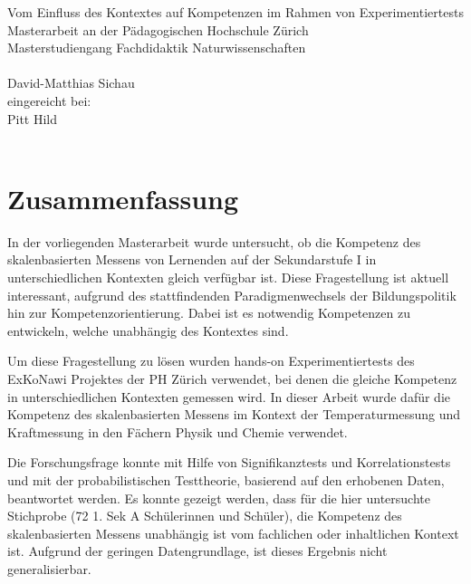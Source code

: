 \documentclass[12pt,oneside, DIV11]{scrbook}
\begin{document}
\frontmatter

\begin{titlepage}
	\vspace*{2cm}
	\begin{center}
		{\LARGE Vom Einfluss des Kontextes auf Kompetenzen im Rahmen von Experimentiertests
		 \vspace*{2cm}\\ Masterarbeit an der Pädagogischen Hochschule Zürich\vspace*{1cm}\\Masterstudiengang Fachdidaktik Naturwissenschaften\\}
		\vspace*{2cm}{\normalsize vorgelegt von:}\\ \large David-Matthias Sichau \\
		\vspace*{1.5cm} {\normalsize  eingereicht bei:}\\ \large Pitt Hild \\
		\vspace*{2cm}{\large 05. Februar 2015, Zürich}\\
	\end{center}
\end{titlepage}



\frontmatter 
\tableofcontents



\chapter*{Zusammenfassung}

In der vorliegenden Masterarbeit wurde untersucht, ob die Kompetenz des skalenbasierten Messens von Lernenden auf der Sekundarstufe I in unterschiedlichen Kontexten gleich verfügbar ist. Diese Fragestellung ist aktuell interessant, aufgrund des stattfindenden Paradigmenwechsels der Bildungspolitik hin zur Kompetenzorientierung. Dabei ist es notwendig Kompetenzen zu entwickeln, welche unabhängig des Kontextes sind.

Um diese Fragestellung zu lösen wurden hands-on Experimentiertests des ExKoNawi Projektes der PH Zürich verwendet, bei denen die gleiche Kompetenz in unterschiedlichen Kontexten gemessen wird. In dieser Arbeit wurde dafür die Kompetenz des skalenbasierten Messens im Kontext der Temperaturmessung und Kraftmessung in den Fächern Physik und Chemie verwendet.

Die Forschungsfrage konnte mit Hilfe von Signifikanztests und Korrelationstests und mit der probabilistischen Testtheorie, basierend auf den erhobenen Daten, beantwortet werden. Es konnte gezeigt werden, dass für die hier untersuchte Stichprobe (72 1. Sek A Schülerinnen und Schüler), die Kompetenz des skalenbasierten Messens unabhängig ist vom fachlichen oder inhaltlichen Kontext ist. Aufgrund der geringen Datengrundlage, ist dieses Ergebnis nicht generalisierbar. 
\end{document}
